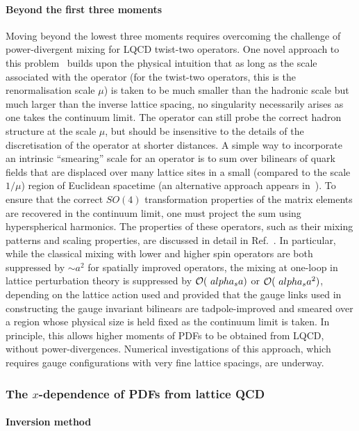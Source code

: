 \paragraph*{Beyond the first three moments} Moving beyond the lowest three moments requires overcoming the challenge of power-divergent mixing for LQCD twist-two operators. One novel approach to this problem~\cite{Davoudi:2012ya} builds upon the physical intuition that as long as the scale associated with the operator (for the twist-two operators, this is the renormalisation scale $\mu$) is taken to be much smaller than the hadronic scale but much larger than the inverse lattice spacing, no singularity necessarily arises as one takes the continuum limit. The operator can still probe the correct hadron structure at the scale $\mu$, but should be insensitive to the details of the discretisation of the operator at shorter distances. A simple way to incorporate an intrinsic ``smearing” scale for an operator is to sum over bilinears of quark fields that are displaced over many lattice sites in a small (compared to the scale $1/\mu$) region of Euclidean spacetime (an alternative approach appears in~\cite{Monahan:2015lha}). To ensure that the correct $SO(4)$ transformation properties of the matrix elements are recovered in the continuum limit, one must project the sum using hyperspherical harmonics. The properties of these operators, such as their mixing patterns and scaling properties, are discussed in detail in
Ref.~\cite{Davoudi:2012ya}. In particular, while the classical mixing with lower and higher spin operators are both suppressed by $\sim a^2$ for spatially improved operators, the mixing at one-loop in lattice perturbation theory is suppressed by ${\cal O}(\ alpha_s a)$ or ${\cal O}(\ alpha_s a^2)$, depending on the lattice action used and provided that the gauge links used in constructing the gauge invariant bilinears are tadpole-improved and smeared over a region whose physical size is held fixed as the continuum limit is taken. In principle, this allows higher moments of PDFs to be obtained from LQCD, without power-divergences. Numerical investigations of this approach, which requires gauge configurations with very fine lattice spacings, are underway. 

\subsubsection{The $x$-dependence of PDFs from lattice QCD}

\paragraph{Inversion method}


